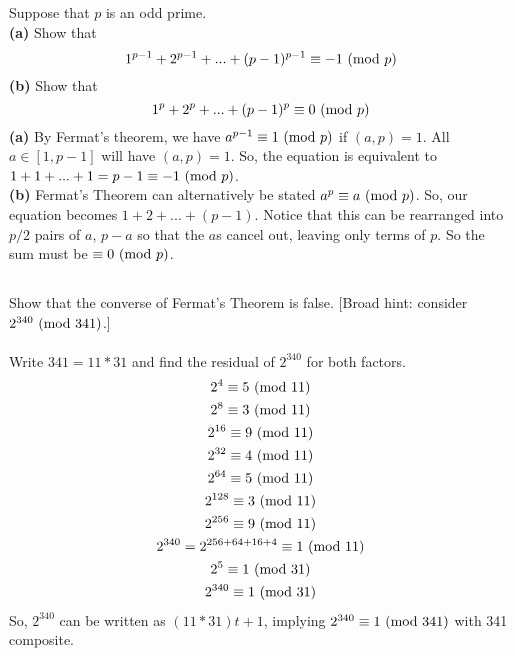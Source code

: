 \documentclass{article}
\begin{document}
\subsection{}
Suppose that $p$ is an odd prime.\\
\textbf{(a)} Show that
\begin{equation*}
    1^{p - 1} + 2^{p - 1} + ... + (p - 1)^{p - 1} \equiv -1 \ (\mathrm{mod}\ p)
\end{equation*}
\textbf{(b)} Show that
\begin{equation*}
    1^p + 2^p + ... + (p - 1)^p \equiv 0 \ (\mathrm{mod}\ p)
\end{equation*}
\textbf{(a)} 
By Fermat's theorem, we have $a^{p - 1} \equiv 1 \ (\mathrm{mod}\ p)$ if $(a, p) = 1$.
All $a \in [1, p - 1]$ will have $(a, p) = 1$.
So, the equation is equivalent to $1 + 1 + ... + 1 = p - 1 \equiv -1 \ (\mathrm{mod}\ p)$.\\
\textbf{(b)} Fermat's Theorem can alternatively be stated $a^p \equiv a \ (\mathrm{mod}\ p)$.
So, our equation becomes $1 + 2 + ... + (p - 1)$.
Notice that this can be rearranged into $p / 2$ pairs of $a$, $p - a$ so that
the $a$s cancel out, leaving only terms of $p$.
So the sum must be $\equiv 0 \ (\mathrm{mod}\ p)$.

\subsection{}
Show that the converse of Fermat's Theorem is false.
[Broad hint: consider $2^{340}\ (\mathrm{mod}\ 341)$.]\\~\\
Write $341 = 11 * 31$ and find the residual of $2^{340}$ for both factors.
\begin{gather*}
    2^4 \equiv 5 \ (\mathrm{mod}\ 11)\\
    2^8 \equiv 3 \ (\mathrm{mod}\ 11)\\
    2^{16} \equiv 9 \ (\mathrm{mod}\ 11)\\
    2^{32} \equiv 4 \ (\mathrm{mod}\ 11)\\
    2^{64} \equiv 5 \ (\mathrm{mod}\ 11)\\
    2^{128} \equiv 3 \ (\mathrm{mod}\ 11)\\
    2^{256} \equiv 9 \ (\mathrm{mod}\ 11)\\
    2^{340} = 2^{256 + 64 + 16 + 4} \equiv 1 \ (\mathrm{mod}\ 11)\\
    2^5 \equiv 1 \ (\mathrm{mod}\ 31)\\
    2^{340} \equiv 1 \ (\mathrm{mod}\ 31)
\end{gather*}
So, $2^{340}$ can be written as $(11 * 31)t + 1$, implying $2^{340} \equiv 1 \ (\mathrm{mod}\ 341)$
with 341 composite.
\end{document}
